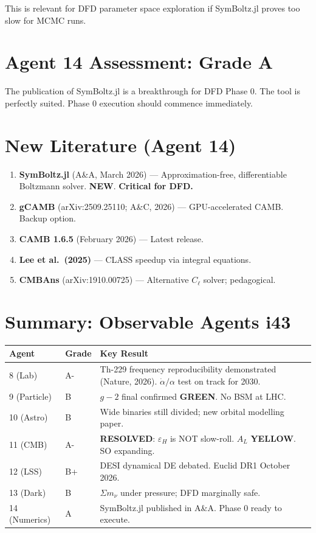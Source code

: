 \documentclass[11pt,a4paper]{article}
\newcommand{\GREEN}{\textcolor{dfdgreen}{\textbf{GREEN}}}
\newcommand{\YELLOW}{\textcolor{dfdyellow}{\textbf{YELLOW}}}
\newcommand{\NEW}{\textcolor{dfdblue}{\textbf{NEW}}}
\newcommand{\RESOLVED}{\textcolor{dfdgreen}{\textbf{RESOLVED}}}
\begin{document}
This is relevant for DFD parameter space exploration if SymBoltz.jl proves too slow for MCMC runs.

\section{Agent 14 Assessment: Grade A}

The publication of SymBoltz.jl is a breakthrough for DFD Phase 0. The tool is perfectly suited. Phase 0 execution should commence immediately.

\section{New Literature (Agent 14)}

\begin{enumerate}
\item \textbf{SymBoltz.jl} (A\&A, March 2026) --- Approximation-free, differentiable Boltzmann solver. \NEW. \textbf{Critical for DFD.}
\item \textbf{gCAMB} (arXiv:2509.25110; A\&C, 2026) --- GPU-accelerated CAMB. Backup option.
\item \textbf{CAMB 1.6.5} (February 2026) --- Latest release.
\item \textbf{Lee et al.\ (2025)} --- CLASS speedup via integral equations.
\item \textbf{CMBAns} (arXiv:1910.00725) --- Alternative $C_\ell$ solver; pedagogical.
\end{enumerate}


\section*{Summary: Observable Agents i43}

\begin{center}
\begin{tabular}{llp{9cm}}
\toprule
\textbf{Agent} & \textbf{Grade} & \textbf{Key Result} \\
\midrule
8 (Lab) & A- & Th-229 frequency reproducibility demonstrated (Nature, 2026). $\dot{\alpha}/\alpha$ test on track for 2030. \\
9 (Particle) & B & $g-2$ final confirmed \GREEN. No BSM at LHC. \\
10 (Astro) & B & Wide binaries still divided; new orbital modelling paper. \\
11 (CMB) & A- & \RESOLVED: $\varepsilon_H$ is NOT slow-roll. $A_L$ \YELLOW. SO expanding. \\
12 (LSS) & B+ & DESI dynamical DE debated. Euclid DR1 October 2026. \\
13 (Dark) & B & $\Sigma m_\nu$ under pressure; DFD marginally safe. \\
14 (Numerics) & A & SymBoltz.jl published in A\&A. Phase 0 ready to execute. \\
\bottomrule
\end{tabular}
\end{center}
\end{document}
